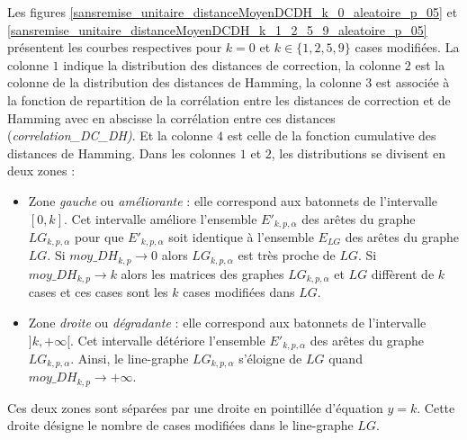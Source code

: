 Les figures \ref{sansremise_unitaire_distanceMoyenDCDH_k_0_aleatoire_p_05} et \ref{sansremise_unitaire_distanceMoyenDCDH_k_1_2_5_9_aleatoire_p_05} pr\'esentent les courbes respectives pour $k=0$ et $k \in \{1,2,5,9\}$ cases modifi\'ees. 
La colonne $1$ indique la distribution des distances de correction, la colonne $2$ est la colonne de la distribution des distances de Hamming, la colonne $3$ est associ\'ee \`a la fonction de repartition de la corr\'elation entre les distances de correction et de Hamming avec en abscisse la corr\'elation entre ces distances ({\em correlation\_DC\_DH)}. 
Et la colonne $4$ est celle de la fonction cumulative des distances de Hamming.
Dans les colonnes $1$ et $2$, les distributions se divisent en deux zones : 
\begin{itemize}
\item Zone {\em gauche} ou {\em am\'eliorante} : elle correspond aux batonnets de l'intervalle $[0,k]$. Cet intervalle  am\'eliore l'ensemble $E'_{k,p,\alpha}$ des ar\^etes du graphe $LG_{k,p,\alpha}$ pour que $E'_{k,p,\alpha}$ soit identique \`a l'ensemble $E_{LG}$ des ar\^etes du graphe $LG$. Si $moy\_DH_{k,p} \rightarrow 0$ alors $LG_{k,p,\alpha}$ est tr\`es proche de $LG$. Si $moy\_DH_{k,p} \rightarrow k$ alors les matrices des graphes $LG_{k,p,\alpha}$ et $LG$ diff\`erent de $k$ cases et ces cases sont les $k$ cases modifi\'ees dans $LG$.
\item Zone {\em droite} ou {\em d\'egradante} : elle correspond aux batonnets de l'intervalle $]k, +\infty[$. Cet intervalle d\'et\'eriore  l'ensemble $E'_{k,p,\alpha}$ des ar\^etes du graphe $LG_{k,p,\alpha}$. Ainsi, le line-graphe $LG_{k,p,\alpha}$ s'\'eloigne de $LG$ quand $moy\_DH_{k,p} \rightarrow +\infty$.
\end{itemize}
Ces deux zones sont s\'epar\'ees par une droite en pointill\'ee d'\'equation $y = k$.  Cette droite d\'esigne le nombre de cases modifi\'ees dans le line-graphe $LG$.
\newline

